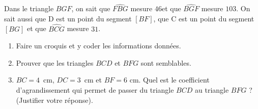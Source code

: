 \begin{minipage}{0.99\linewidth}
\exo

Dans le triangle $BGF$, on sait que $\widehat{FBG}$ mesure $46$\degre et que $\widehat{BGF}$ mesure $103$\degre. On sait aussi que D est un point du segment $[BF]$, que C est un point du segment $[BG]$ et que $\widehat{BCG}$ mesure $31$\degre.

		\begin{enumerate}
		\item Faire un croquis et y coder les informations données.
		\item Prouver que les triangles $BCD$ et $BFG$ sont semblables.
		\item $BC= 4$~cm, $DC=3$~cm et $BF=6$ cm. Quel est le coefficient d'agrandissement qui permet de passer du triangle $BCD$ au triangle $BFG$ ? (Justifier votre réponse).
		\end{enumerate}	

\end{minipage}

\vspace{0.5cm}
